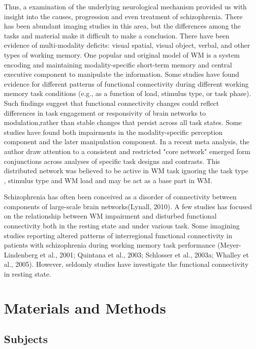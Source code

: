 \documentclass[preprint,authoryear,review,12pt]{elsarticle}
\begin{document}
Thus, a examination of the underlying neurological mechanism provided us with insight into the causes, progression and even treatment of schizophrenia. There has been abundant imaging studies in this area, but the differences among the tasks and material make it difficult to make a conclusion. There have been evidence of multi-modality deficits: visual spatial, visual object, verbal, and other types of working memory. One popular and original model of WM is a system encoding and maintaining modality-specific short-term memory and central executive component to manipulate the information. Some studies have found evidence for different patterns of functional connectivity during different working memory task conditions (e.g., as a function of load, stimulus type, or task phase).  Such ﬁndings suggest that functional connectivity changes could reﬂect differences in task engagement or responsivity of brain networks to modulation,rather than stable changes that persist across all task states. Some studies have found both impairments in the modality-specific perception component and the later manipulation component. In a recent meta analysis, the author draw attention to a consistent and restricted "core network" emerged form conjunctions across analyses of specific task designs and contrasts. This distributed network was believed to be active in WM task ignoring the task type , stimulus type and WM load and may be act as a base part in WM. 

Schizophrenia has often been conceived as a disorder of connectivity between components of large-scale brain networks(Lynall, 2010). A few studies has focused on the relationship between WM impairment and disturbed functional connectivity both in the resting state and under various task. Some imagining studies reporting altered 
patterns of interregional functional connectivity in patients with schizophrenia during working memory task performance (Meyer-Lindenberg et al., 2001; Quintana et al., 2003; Schlosser et al., 2003a; Whalley et al., 2005). However, seldomly studies have investigate the functional connectivity in resting state. 

\section*{Materials and Methods}

\subsection*{Subjects}
\end{document}
